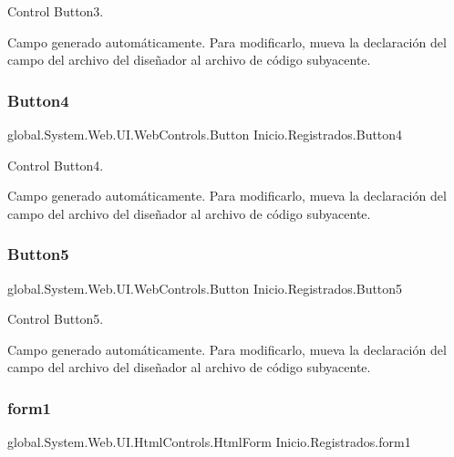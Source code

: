 Control Button3. 

Campo generado automáticamente. Para modificarlo, mueva la declaración del campo del archivo del diseñador al archivo de código subyacente. \mbox{\label{class_inicio_1_1_registrados_a17ce0318c403c057f81a1d740673a57f}} 
\subsubsection{\texorpdfstring{Button4}{Button4}}
{\footnotesize\ttfamily global.\+System.\+Web.\+U\+I.\+Web\+Controls.\+Button Inicio.\+Registrados.\+Button4\hspace{0.3cm}{\ttfamily [protected]}}



Control Button4. 

Campo generado automáticamente. Para modificarlo, mueva la declaración del campo del archivo del diseñador al archivo de código subyacente. \mbox{\label{class_inicio_1_1_registrados_a07302395de09db810ad8f7f096762449}} 
\subsubsection{\texorpdfstring{Button5}{Button5}}
{\footnotesize\ttfamily global.\+System.\+Web.\+U\+I.\+Web\+Controls.\+Button Inicio.\+Registrados.\+Button5\hspace{0.3cm}{\ttfamily [protected]}}



Control Button5. 

Campo generado automáticamente. Para modificarlo, mueva la declaración del campo del archivo del diseñador al archivo de código subyacente. \mbox{\label{class_inicio_1_1_registrados_a902f9075b41d6386d17242fe32dea6e4}} 
\subsubsection{\texorpdfstring{form1}{form1}}
{\footnotesize\ttfamily global.\+System.\+Web.\+U\+I.\+Html\+Controls.\+Html\+Form Inicio.\+Registrados.\+form1\hspace{0.3cm}{\ttfamily [protected]}}



